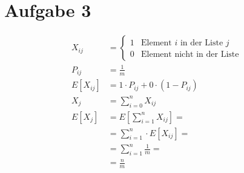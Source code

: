 \section*{Aufgabe 3}
\begin{align*}
	X_{ij} &= \left\{ \begin{matrix}
    	1 & \text{Element $i$ in der Liste $j$} \\
        0 & \text{Element nicht in der Liste}
    \end{matrix}\right. \\
    P_{ij} &= \frac{1}{m} \\
    E[X_{ij}] &= 1 \cdot P_{ij} + 0 \cdot (1 - P_{ij}) \\
    X_j &= \sum_{i = 0}^n X_{ij} \\
    E[X_j] &= E\left[ \sum_{i = 1}^n X_{ij} \right] = \\
    &= \sum_{i = 1}^n \cdot E[X_{ij}] = \\
    &= \sum_{i = 1}^n \frac{1}{m} = \\
    &= \frac{n}{m}
\end{align*}